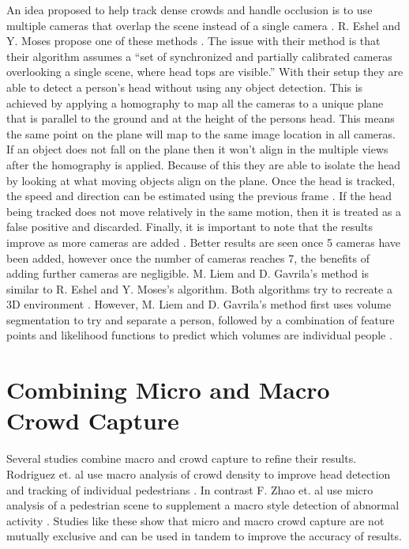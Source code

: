 \documentclass[12pt, twocolumn, conference]{IEEEtran}
\begin{document}
An idea proposed to help track dense crowds and handle occlusion is to use multiple cameras that overlap the scene instead of a single camera \cite{R. Eshel}\cite{M. Liem}. R. Eshel and Y. Moses propose one of these methods \cite{R. Eshel}. The issue with their method is that their algorithm assumes a “set of synchronized and partially calibrated cameras overlooking a single scene, where head tops are visible.” With their setup they are able to detect a person’s head without using any object detection. This is achieved by applying a homography to map all the cameras to a unique plane that is parallel to the ground and at the height of the persons head. This means the same point on the plane will map to the same image location in all cameras. If an object does not fall on the plane then it won’t align in the multiple views after the homography is applied. Because of this they are able to isolate the head by looking at what moving objects align on the plane.
Once the head is tracked, the speed and direction can be estimated using the previous frame \cite{R. Eshel}. If the head being tracked does not move relatively in the same motion, then it is treated as a false positive and discarded. 
Finally, it is important to note that the results improve as more cameras are added \cite{R. Eshel}. Better results are seen once 5 cameras have been added, however once the number of cameras reaches 7, the benefits of adding further cameras are negligible.
M. Liem and D. Gavrila’s method is similar to R. Eshel and Y. Moses’s algorithm. Both algorithms try to recreate a 3D environment \cite{R. Eshel}\cite{M. Liem}. However, M. Liem and D. Gavrila’s method first uses volume segmentation to try and separate a person, followed by a combination of feature points and likelihood functions to predict which volumes are individual people \cite{M. Liem}.


\section{Combining Micro and Macro Crowd Capture}

Several studies combine macro and crowd capture to refine their results. Rodriguez et. al use macro analysis of crowd density to improve head detection and tracking of individual pedestrians \cite{M. Rodriguez}. In contrast F. Zhao et. al use micro analysis of a pedestrian scene to supplement a macro style detection of abnormal activity \cite{D. Zhang}. Studies like these show that micro and macro crowd capture are not mutually exclusive and can be used in tandem to improve the accuracy of results. 
\end{document}
